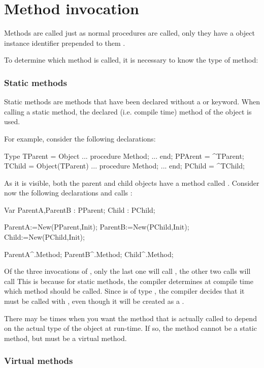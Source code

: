 \documentclass{report}
\begin{document}
\section{Method invocation}
Methods are called just as normal procedures are called, only they have a 
object instance identifier prepended to them
.

To determine which method is called, it is necessary to know the type of
method:

\subsubsection{Static methods}
Static methods are methods that have been declared without a 
or  keyword. When calling a static method, the declared (i.e.
compile time) method of the object is used.

For example, consider the following declarations:
\begin{listing}
Type
  TParent = Object 
    ...
    procedure Method;
    ...
    end;
  PPArent = ^TParent;
  TChild = Object(TParent) 
    ...
    procedure Method;
    ...
    end;
  PChild = ^TChild;  
\end{listing}
As it is visible, both the parent and child objects have a method called
. Consider now the following declarations and calls :
\begin{listing}
Var ParentA,ParentB : PParent;
    Child           : PChild;

   ParentA:=New(PParent,Init);
   ParentB:=New(PChild,Init);
   Child:=New(PChild,Init);

   ParentA^.Method;
   ParentB^.Method;
   Child^.Method;
\end{listing}
Of the three invocations of , only the last one will call
, the other two calls will call  
This is because for static methods, the compiler determines at compile 
time which method should be called. Since  is of type
, the compiler decides that it must be called with
, even though it will be created as a .

There may be times when you want the method that is actually called to
depend on the actual type of the object at run-time. If so, the method
cannot be a static method, but must be a virtual method.

\subsubsection{Virtual methods}
\end{document}
